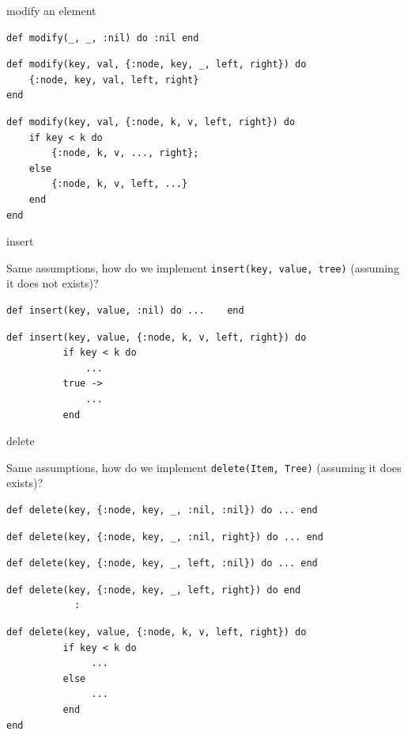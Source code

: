 \begin{frame}[fragile]{modify an element}

\begin{verbatim}
def modify(_, _, :nil) do :nil end
\end{verbatim}
\pause
\begin{verbatim}
def modify(key, val, {:node, key, _, left, right}) do 
    {:node, key, val, left, right}
end
\end{verbatim}
\pause
\begin{verbatim}
def modify(key, val, {:node, k, v, left, right}) do 
    if key < k do
        {:node, k, v, ..., right};
    else
        {:node, k, v, left, ...}
    end
end
\end{verbatim}

\end{frame}


\begin{frame}[fragile]{insert}

Same assumptions, how do we implement {\tt insert(key, value, tree)} (assuming it does not exists)?

\pause\vspace{20pt}

\begin{verbatim}
def insert(key, value, :nil) do ...    end
\end{verbatim}
\pause
\begin{verbatim}
def insert(key, value, {:node, k, v, left, right}) do 
          if key < k do
              ... 
          true -> 
              ...
          end
\end{verbatim}

\end{frame}


\begin{frame}[fragile]{delete}

Same assumptions, how do we implement {\tt delete(Item, Tree)} (assuming it does exists)?

\pause\vspace{20pt}

\begin{verbatim}
def delete(key, {:node, key, _, :nil, :nil}) do ... end
\end{verbatim}
\pause
\begin{verbatim}
def delete(key, {:node, key, _, :nil, right}) do ... end
\end{verbatim}
\pause
\begin{verbatim}
def delete(key, {:node, key, _, left, :nil}) do ... end
\end{verbatim}
\pause
\begin{verbatim}
def delete(key, {:node, key, _, left, right}) do end
            :
\end{verbatim}
\pause
\begin{verbatim}
def delete(key, value, {:node, k, v, left, right}) do 
          if key < k do
               ...
          else
               ...
          end
end
\end{verbatim}
\end{frame}

